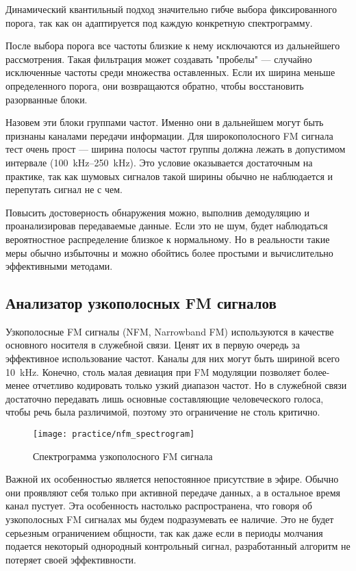 Динамический квантильный подход значительно гибче выбора фиксированного порога, так как он адаптируется под каждую конкретную спектрограмму.

После выбора порога все частоты близкие к нему исключаются из дальнейшего рассмотрения. Такая фильтрация может создавать "пробелы" --- случайно исключенные частоты среди множества оставленных. Если их ширина меньше определенного порога, они возвращаются обратно, чтобы восстановить разорванные блоки.

Назовем эти блоки группами частот. Именно они в дальнейшем могут быть признаны каналами передачи информации. Для широкополосного FM сигнала тест очень прост --- ширина полосы частот группы должна лежать в допустимом интервале (\SIrange{100}{250}{\kilo\hertz}). Это условие оказывается достаточным на практике, так как шумовых сигналов такой ширины обычно не наблюдается и перепутать сигнал не с чем.

Повысить достоверность обнаружения можно, выполнив демодуляцию и проанализировав передаваемые данные. Если это не шум, будет наблюдаться вероятностное распределение близкое к нормальному. Но в реальности такие меры обычно избыточны и можно обойтись более простыми и вычислительно эффективными методами.


\subsection{Анализатор узкополосных FM сигналов}

Узкополосные FM сигналы (NFM, Narrowband FM) используются в качестве основного носителя в служебной связи.
Ценят их в первую очередь за эффективное использование частот. Каналы для них могут быть шириной всего \SI{10}{\kilo\hertz}. Конечно, столь малая девиация при FM модуляции позволяет более-менее отчетливо кодировать только узкий диапазон частот. Но в служебной связи достаточно передавать лишь основные составляющие человеческого голоса, чтобы речь была различимой, поэтому это ограничение не столь критично.

\begin{figure}[h]
  \centering
  \texttt{[image: practice/nfm\_spectrogram]}
  \caption{Спектрограмма узкополосного FM сигнала}
  \label{fig:practice:nfm_spectrogram}
\end{figure}

Важной их особенностью является непостоянное присутствие в эфире. Обычно они проявляют себя только при активной передаче данных, а в остальное время канал пустует. Эта особенность настолько распространена, что говоря об узкополосных FM сигналах мы будем подразумевать ее наличие. Это не будет серьезным ограничением общности, так как даже если в периоды молчания подается некоторый однородный контрольный сигнал, разработанный алгоритм не потеряет своей эффективности.

